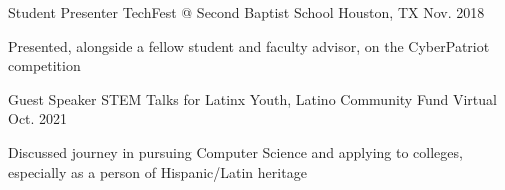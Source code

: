 

\begin{cventries}

  \cventry
    {Student Presenter} %
    {TechFest @ Second Baptist School} %
    {Houston, TX} %
    {Nov. 2018} %
    {
      \begin{cvitems} %
        \item {Presented, alongside a fellow student and faculty advisor, on the CyberPatriot competition}
      \end{cvitems}
    }

  \cventry
    {Guest Speaker} %
    {STEM Talks for Latinx Youth, Latino Community Fund} %
    {Virtual} %
    {Oct. 2021} %
    {
      \begin{cvitems} %
        \item {Discussed journey in pursuing Computer Science and applying to colleges, especially as a person of Hispanic/Latin heritage}
      \end{cvitems}
    }

\end{cventries}
